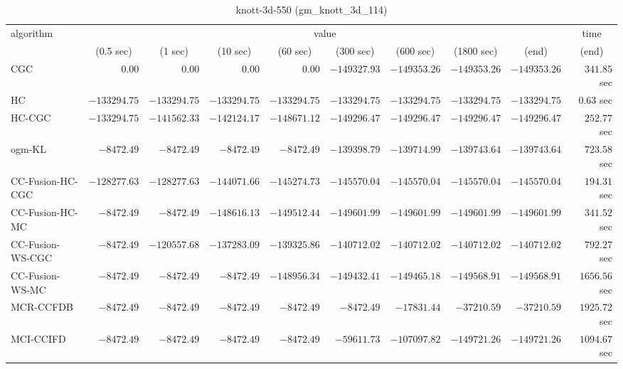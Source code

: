 \begin{table}[H]
\scriptsize
\centering
\caption{knott-3d-550 (gm\_knott\_3d\_114)}
\label{tab:anytimetable-knott-3d-550-gm-knott-3d-114}
\begin{tabular}{lrrrrrrrrr}
\toprule
           algorithm &                                   \multicolumn{8}{c}{value} & \multicolumn{1}{c}{time}   \\  
\cmidrule(lr){2-9}\cmidrule(lr){10-10}   
                     & \multicolumn{1}{c}{(0.5 sec)} & \multicolumn{1}{c}{(1 sec)} & \multicolumn{1}{c}{(10 sec)} & \multicolumn{1}{c}{(60 sec)} & \multicolumn{1}{c}{(300 sec)} & \multicolumn{1}{c}{(600 sec)} & \multicolumn{1}{c}{(1800 sec)} & \multicolumn{1}{c}{(end)} & \multicolumn{1}{c}{(end)}   \\ \midrule 
                 CGC & $         0.00$ & $         0.00$ & $         0.00$ & $         0.00$ & $   -149327.93$ & $   -149353.26$ & $   -149353.26$ & $   -149353.26$ & $       341.85$ sec   \\ 
                  HC & $   -133294.75$ & $   -133294.75$ & $   -133294.75$ & $   -133294.75$ & $   -133294.75$ & $   -133294.75$ & $   -133294.75$ & $   -133294.75$ & $         0.63$ sec   \\ 
              HC-CGC & $   -133294.75$ & $   -141562.33$ & $   -142124.17$ & $   -148671.12$ & $   -149296.47$ & $   -149296.47$ & $   -149296.47$ & $   -149296.47$ & $       252.77$ sec   \\ 
              ogm-KL & $     -8472.49$ & $     -8472.49$ & $     -8472.49$ & $     -8472.49$ & $   -139398.79$ & $   -139714.99$ & $   -139743.64$ & $   -139743.64$ & $       723.58$ sec   \\ 
    CC-Fusion-HC-CGC & $   -128277.63$ & $   -128277.63$ & $   -144071.66$ & $   -145274.73$ & $   -145570.04$ & $   -145570.04$ & $   -145570.04$ & $   -145570.04$ & $       194.31$ sec   \\ 
     CC-Fusion-HC-MC & $     -8472.49$ & $     -8472.49$ & $   -148616.13$ & $   -149512.44$ & $   -149601.99$ & $   -149601.99$ & $   -149601.99$ & $   -149601.99$ & $       341.52$ sec   \\ 
    CC-Fusion-WS-CGC & $     -8472.49$ & $   -120557.68$ & $   -137283.09$ & $   -139325.86$ & $   -140712.02$ & $   -140712.02$ & $   -140712.02$ & $   -140712.02$ & $       792.27$ sec   \\ 
     CC-Fusion-WS-MC & $     -8472.49$ & $     -8472.49$ & $     -8472.49$ & $   -148956.34$ & $   -149432.41$ & $   -149465.18$ & $   -149568.91$ & $   -149568.91$ & $      1656.56$ sec   \\ 
\cmidrule{1-1} 
           MCR-CCFDB & $     -8472.49$ & $     -8472.49$ & $     -8472.49$ & $     -8472.49$ & $     -8472.49$ & $    -17831.44$ & $    -37210.59$ & $    -37210.59$ & $      1925.72$ sec   \\ 
\cmidrule{1-1} 
           MCI-CCIFD & $     -8472.49$ & $     -8472.49$ & $     -8472.49$ & $     -8472.49$ & $    -59611.73$ & $   -107097.82$ & $   -149721.26$ & $   -149721.26$ & $      1094.67$ sec   \\ 
\bottomrule
\end{tabular}
\end{table}

